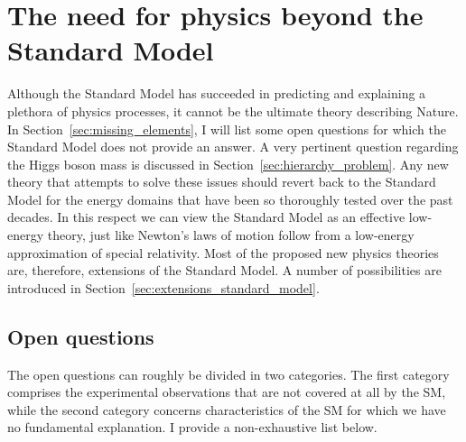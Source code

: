 \chapter{The need for physics beyond the Standard Model \label{chap:beyond_standard_model}}

Although the Standard Model has succeeded in predicting and explaining a plethora of physics
processes, it cannot be the ultimate theory describing Nature. In
Section~\ref{sec:missing_elements}, I will list some open questions for which the Standard Model
does not provide an answer. A very pertinent question regarding the Higgs boson mass is discussed
in Section~\ref{sec:hierarchy_problem}.
Any new theory that attempts to solve these issues should revert back to
the Standard Model for the energy domains that have been so thoroughly tested over the past
decades. In this respect we can view the Standard Model as an effective low-energy theory, just
like Newton's laws of motion follow from a low-energy approximation of special relativity. 
Most of the proposed new physics theories are, therefore, extensions of the Standard Model. 
A number of possibilities are introduced in Section~\ref{sec:extensions_standard_model}.

\section{Open questions \label{sec:missing_elements}}

The open questions can roughly be divided in two categories. The first category comprises the
experimental observations that are not covered at all by the SM, while the second category concerns
characteristics of the SM for which we have no fundamental explanation. 
I provide a non-exhaustive list below.

